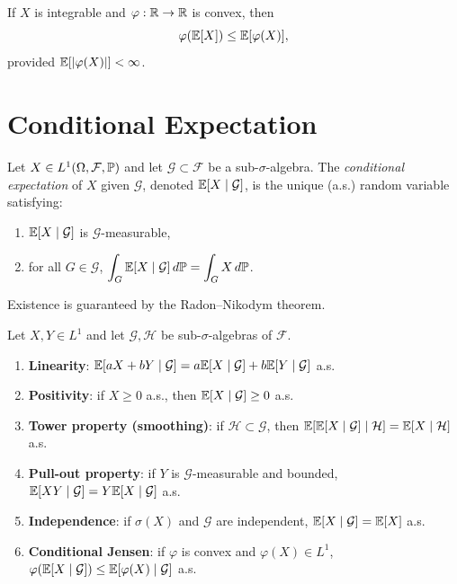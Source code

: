 \begin{theorem}
\label{thm:jensen}
If $X$ is integrable and $\varphi : \mathbb{R} \to \mathbb{R}$ is convex, then
\[
  \varphi(\mathbb{E}[X]) \leq \mathbb{E}[\varphi(X)],
\]
provided $\mathbb{E}[\left| \varphi(X) \right|] < \infty$.
\end{theorem}

\section{Conditional Expectation}

\begin{definition}
\label{def:cond_exp}
Let $X \in L^1(\Omega, \mathcal{F}, \mathbb{P})$ and let $\mathcal{G} \subset \mathcal{F}$
be a sub-$\sigma$-algebra. The \emph{conditional expectation} of $X$ given
$\mathcal{G}$, denoted $\mathbb{E}[X \mid \mathcal{G}]$, is the unique (a.s.) random
variable satisfying:
\begin{enumerate}
  \item $\mathbb{E}[X \mid \mathcal{G}]$ is $\mathcal{G}$-measurable,
  \item for all $G \in \mathcal{G}$, $\displaystyle \int_G \mathbb{E}[X \mid \mathcal{G}] \, d\mathbb{P}
    = \int_G X \, d\mathbb{P}$.
\end{enumerate}
Existence is guaranteed by the Radon--Nikodym theorem.
\end{definition}

\begin{theorem}
\label{thm:ce_props}
Let $X, Y \in L^1$ and let $\mathcal{G}, \mathcal{H}$ be sub-$\sigma$-algebras of $\mathcal{F}$.
\begin{enumerate}
  \item \textbf{Linearity}: $\mathbb{E}[aX + bY \mid \mathcal{G}] = a\mathbb{E}[X \mid \mathcal{G}]
    + b\mathbb{E}[Y \mid \mathcal{G}]$ a.s.
  \item \textbf{Positivity}: if $X \geq 0$ a.s., then $\mathbb{E}[X \mid \mathcal{G}] \geq 0$ a.s.
  \item \textbf{Tower property (smoothing)}: if $\mathcal{H} \subset \mathcal{G}$,
    then $\mathbb{E}[\mathbb{E}[X \mid \mathcal{G}] \mid \mathcal{H}] = \mathbb{E}[X \mid \mathcal{H}]$ a.s.
  \item \textbf{Pull-out property}: if $Y$ is $\mathcal{G}$-measurable and bounded,
    $\mathbb{E}[XY \mid \mathcal{G}] = Y \mathbb{E}[X \mid \mathcal{G}]$ a.s.
  \item \textbf{Independence}: if $\sigma(X)$ and $\mathcal{G}$ are independent,
    $\mathbb{E}[X \mid \mathcal{G}] = \mathbb{E}[X]$ a.s.
  \item \textbf{Conditional Jensen}: if $\varphi$ is convex and $\varphi(X) \in L^1$,
    $\varphi(\mathbb{E}[X \mid \mathcal{G}]) \leq \mathbb{E}[\varphi(X) \mid \mathcal{G}]$ a.s.
\end{enumerate}
\end{theorem}

